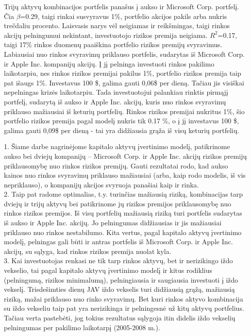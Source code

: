 \documentclass[12pt, a14paper, lithuanian]{article}
\begin{document}
Trijų aktyvų kombinacijos portfelis panašus į aukso ir Microsoft Corp. portfelį. Čia $\beta$=0.29, taigi rinkai susvyravus 1\%,
portfelio akcijos pakils arba nukris trečdaliu procento. Laisvasis narys vėl neigiamas ir reikšmingas, taigi
rinkos akcijų pelningumui nekintant, investuotojo rizikos premija neigiama. $R^2$=0.17, taigi 17\% rinkos duomenų
paaiškina portfelio rizikos premijų svyravimus.\\


Labiausiai nuo rinkos svyravimų priklauso portfelis, sudarytas iš Microsoft Corp. ir Apple Inc. kompanijų akcijų. 
Į jį pelninga investuoti rinkos pakilimo laikotarpiu, nes rinkos rizikos premijai pakilus 1\%, portfelio rizikos premija
taip pat išaugs 1\%. Investavus 100 \$, galima gauti 0,06\$ per dieną. Tačiau jis visiškai nepelningas krizės 
laikotarpiu. Tada investuotojui palankiau rinktis pirmąjį portfelį, sudarytą iš aukso ir Apple Inc. akcijų, kuris nuo 
rinkos svyravimų priklauso mažiausiai iš keturių portfelių. Rinkos rizikos premijai nukritus 1\%, šio portfelio rizikos 
premija pagal modelį nukris tik 0.17 \%, o į jį investavus 100 \$, galima gauti 0,09\$ per dieną - tai yra didžiausia 
grąža iš visų keturių portfelių.



\pagebreak




\newpage      
{}

1. Šiame darbe nagrinėjome kapitalo aktyvų įvertinimo modelį, patikrinome aukso bei dviejų kompanijų -- Microsoft Corp. ir Apple Inc. akcijų rizikos premijų priklausomybę nuo rinkos rizikos premijų. Gauti rezultatai rodo, kad aukso kainos nuo rinkos svyravimų priklauso mažiausiai (arba, kaip rodo modelis, iš vis nepriklauso), o kompanijų akcijos svyruoja panašiai kaip ir rinka.\\

2. Taip pat radome optimalias, t.y. turinčias mažiausią riziką, kombinacijas tarp dviejų ir trijų aktyvų bei patikrinome jų rizikos premijos priklausomybę nuo rinkos rizikos premijos. Iš visų portfelių mažiausią riziką turi portfelis sudarytas iš aukso ir Apple Inc. akcijų. Jo pelningumas didžiausias ir jis mažiausiai priklauso nuo rinkos nestabilumo. Kita vertus, pagal kapitalo aktyvų įvertinimo modelį, pelningas gali būti ir antras portfelis iš Microsoft Corp. ir Apple Inc. akcijų, su sąlyga, kad rinkos rizikos premija nuolat kyla.\\


3. Kai investuotojas renkasi ne tik tarp rinkos aktyvų, bet ir nerizikingo iždo vekselio, tai pagal kapitalo aktyvų įvertinimo modelį ir kitus rodiklius (pelningumą, rizikos minimalumą), pelningiausia ir saugiausia investuoti į iždo vekselį. Trisdešimties dienų JAV iždo vekselis turi didžiausią grąžą, mažiausią riziką, mažai priklauso nuo rinko svyravimų. Bet kuri rinkos aktyvo kombinacija su iždo vekseliu taip pat yra nerizikinga ir pelningesnė už kitų aktyvų portfelius. Tačiau verta pastebėti, jog tokius rezultatus sąlygoja itin didelis iždo vekselių pelningumas per pakilimo laikotarpį (2005-2008 m.).  \\
\end{document}
